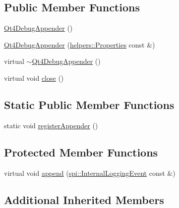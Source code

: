 \subsection*{Public Member Functions}
\begin{DoxyCompactItemize}
\item 
\hyperlink{classlog4cplus_1_1Qt4DebugAppender_a8ade45a5e60da2b7cc48b4b3cc5c12bf}{Qt4\-Debug\-Appender} ()
\item 
\hyperlink{classlog4cplus_1_1Qt4DebugAppender_a1dc305225e779c846aa89459ffbf0cf1}{Qt4\-Debug\-Appender} (\hyperlink{classlog4cplus_1_1helpers_1_1Properties}{helpers\-::\-Properties} const \&)
\item 
virtual \hyperlink{classlog4cplus_1_1Qt4DebugAppender_a958ec8b91b655ebb1adc4d3d2333bbda}{$\sim$\-Qt4\-Debug\-Appender} ()
\item 
virtual void \hyperlink{classlog4cplus_1_1Qt4DebugAppender_ab1abb553de69d023bd7729d040d3ca7e}{close} ()
\end{DoxyCompactItemize}
\subsection*{Static Public Member Functions}
\begin{DoxyCompactItemize}
\item 
static void \hyperlink{classlog4cplus_1_1Qt4DebugAppender_a27bf256c8df5be2d100d386f1e3f406a}{register\-Appender} ()
\end{DoxyCompactItemize}
\subsection*{Protected Member Functions}
\begin{DoxyCompactItemize}
\item 
virtual void \hyperlink{classlog4cplus_1_1Qt4DebugAppender_ad59b24d22c6c579b893fee1451a733dc}{append} (\hyperlink{classlog4cplus_1_1spi_1_1InternalLoggingEvent}{spi\-::\-Internal\-Logging\-Event} const \&)
\end{DoxyCompactItemize}
\subsection*{Additional Inherited Members}


